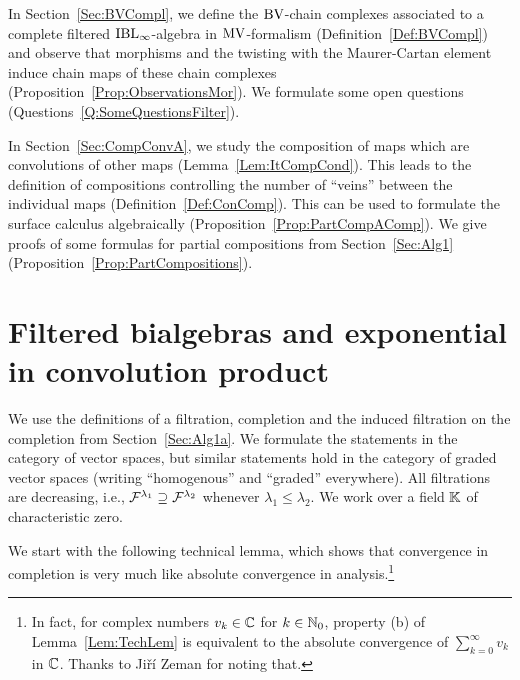 \documentclass[\MainFolder/Text.tex]{subfiles}
\begin{document}
In Section~\ref{Sec:BVCompl}, we define the $\mathrm{BV}$-chain complexes associated to a complete filtered $\mathrm{IBL}_\infty$-algebra in $\mathrm{MV}$-formalism (Definition~\ref{Def:BVCompl}) and observe that morphisms and the twisting with the Maurer-Cartan element induce chain maps of these chain complexes (Proposition~\ref{Prop:ObservationsMor}). We formulate some open questions (Questions~\ref{Q:SomeQuestionsFilter}).

In Section~\ref{Sec:CompConvA}, we study the composition of maps which are convolutions of other maps (Lemma~\ref{Lem:ItCompCond}). This leads to the definition of compositions controlling the number of ``veins'' between the individual maps (Definition~\ref{Def:ConComp}). This can be used to formulate the surface calculus algebraically (Proposition~\ref{Prop:PartCompAComp}). We give proofs of some formulas for partial compositions from Section~\ref{Sec:Alg1} (Proposition~\ref{Prop:PartCompositions}).


\section{Filtered bialgebras and exponential in convolution product}\label{Sec:DetailsOnFiltr}

We use the definitions of a filtration, completion and the induced filtration on the completion from Section~\ref{Sec:Alg1a}. We formulate the statements in the category of vector spaces, but similar statements hold in the category of graded vector spaces (writing ``homogenous'' and ``graded'' everywhere). All filtrations are decreasing, i.e., $\mathcal{F}^{\lambda_1} \supseteq \mathcal{F}^{\lambda_2}$ whenever $\lambda_1 \le \lambda_2$.
We work over a field $\mathbb{K}$ of characteristic zero.

We start with the following technical lemma, which shows that convergence in completion is very much like absolute convergence in analysis.\footnote{In fact, for complex numbers $v_k\in \mathbb{C}$ for $k\in\mathbb{N}_0$, property (b) of Lemma~\ref{Lem:TechLem} is equivalent to the absolute convergence of $\sum_{k=0}^\infty v_k$ in $\mathbb{C}$.
Thanks to Ji\v r\'i Zeman for noting that.}
 
\end{document}
